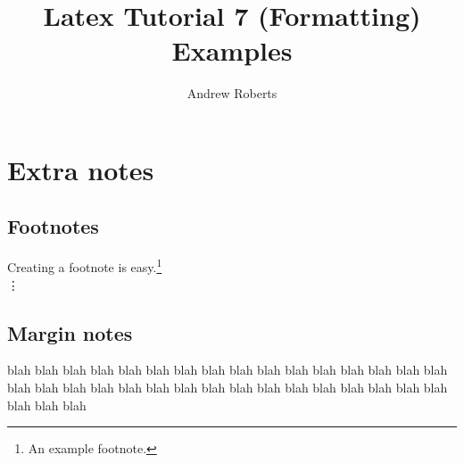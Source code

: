 \documentclass[english]{article}
\begin{document}
\title{Latex Tutorial 7 (Formatting) Examples}
\author{Andrew Roberts}
\maketitle

\section{Extra notes}

\subsection{Footnotes}

\renewcommand{\thefootnote}{\arabic{footnote}}

Creating a footnote is easy.\footnote{An example footnote.}
\\\vdots

\subsection{Margin notes}


blah blah blah blah blah blah blah
blah blah blah blah blah blah blah
blah blah blah blah blah blah blah
blah blah blah blah blah blah blah
blah blah blah blah blah blah blah
\end{document}
